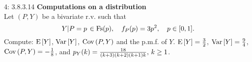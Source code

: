 \documentclass[a4paper,twoside=false,abstract=false,numbers=noenddot,
titlepage=false,headings=small,parskip=half,version=last]{scrartcl}
\begin{document}

\begin{exercise}{4: 3.8.3.14} \textbf{Computations on a distribution} \\
    Let $(P,Y)$ be a bivariate r.v. such that
    \begin{equation}
        \left. Y \middle\vert P=p \right. \in \text{Fs}(p),\quad
        f_P(p)=3p^2,\quad
        p\in [0, 1].
    \end{equation}
    Compute: ${\rm E}\,[Y]$, ${\rm Var}\,[Y]$, ${\rm Cov}\,(P, Y)$ and the p.m.f.
    of $Y$.
    \Answer
    ${{\rm E}\,[Y]=\frac{3}{2}}$,
    ${{\rm Var}\,[Y]=\frac{9}{4}}$,
    ${{\rm Cov}\,(P,Y)=-\frac{1}{8}}$, and
    $p_{Y} (k) = \frac{18}{(k+3)(k+2)(k+1)k},\, k \ge 1$.

\end{exercise}
\end{document}
